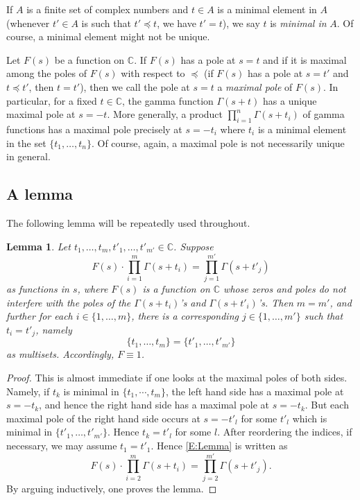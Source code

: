 \documentclass[11pt]{amsart}
\theoremstyle{plain}
\newtheorem{Lem}[equation]{Lemma}
\theoremstyle{definition}
\numberwithin{equation}{section}
\newcommand{\C}{\mathbb C}
\newcommand{\ie}{\text{i.e.\ }}
\begin{document}
If $A$ is a finite set of complex numbers and $t\in A$
is a minimal element in $A$ (\ie whenever $t'\in A$ is such that
$t'\preceq t$, we have $t'=t$), we say $t$ is {\it minimal in}
$A$. Of course, a minimal element might not
be unique.

Let $F(s)$ be a function on $\C$.  If $F(s)$ has a pole at $s=t$ and
if it is maximal among the poles of $F(s)$ with respect to $\preceq$
(\ie if $F(s)$ has a pole at $s=t'$ and
$t\preceq t'$, then $t=t'$), then we call the pole at $s=t$ a {\it
  maximal pole} of $F(s)$. In particular, for a fixed $t\in\C$, the gamma function
$\Gamma(s+t)$ has a unique maximal pole at $s=-t$. More generally, a
product $\prod_{i=1}^n\Gamma(s+t_i)$ of gamma functions has a maximal
pole precisely at $s=-t_i$ where $t_i$ is a minimal
element in the set $\{t_1,\dots,t_n\}$. Of course, again, a maximal
pole is not necessarily unique in general. 


\subsection{A lemma}
The following lemma will be repeatedly used throughout.
\begin{Lem}\label{L:Lemma}
Let $t_1,\dots, t_m, t'_1,\dots, t'_{m'}\in\C$. Suppose
\begin{equation}\label{E:Lemma}
F(s)\cdot\prod_{i=1}^m\Gamma(s+t_i)=\prod_{j=1}^{m'}\Gamma(s+t'_j)
\end{equation}
as functions in $s$, where $F(s)$ is a function on $\C$ whose zeros and poles
do not interfere with the poles of the $\Gamma(s+t_i)$'s and
$\Gamma(s+t'_i)$'s. Then $m=m'$, and further for each $i\in\{1,\dots,m\}$,
there is a corresponding $j\in\{1,\dots,m'\}$ such that
$t_i=t'_j$, namely
\[
\{t_1,\dots,t_m\}=\{t'_1,\dots,t'_{m'}\}
\]
 as multisets. Accordingly, $F\equiv 1$.
\end{Lem}
\begin{proof}
This is almost immediate if one looks at the maximal poles of both
sides. Namely, if $t_k$ is minimal in $\{t_1,\cdots,t_m\}$, the left
hand side has a maximal pole at $s=-t_k$, and hence the right hand
side has a maximal pole at $s=-t_k$. But
each maximal pole of the right hand side occurs at $s=-t'_l$ for some
$t'_l$ which is minimal in $\{t'_1,\dots,t'_{m'}\}$. Hence $t_k=t'_l$ for some $l$. After reordering
the indices, if necessary, we may assume $t_1=t'_1$. Hence
\eqref{E:Lemma} is written as
\[
F(s)\cdot\prod_{i=2}^m\Gamma(s+t_i)=\prod_{j=2}^{m'}\Gamma(s+t'_j).
\]
By arguing inductively, one proves the lemma.
\end{proof}
\end{document}
